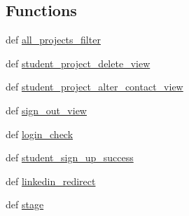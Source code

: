 \subsection*{Functions}
\begin{DoxyCompactItemize}
\item 
def \hyperlink{namespacestudents_1_1views_a021cba8bff39e0d31e6a5357dba3e328}{all\-\_\-projects\-\_\-filter}
\item 
def \hyperlink{namespacestudents_1_1views_a6e2dff61ac7220b69daca0a08765fae8}{student\-\_\-project\-\_\-delete\-\_\-view}
\item 
def \hyperlink{namespacestudents_1_1views_ae09ce1ee44f9b0abd1d61b02f8292b04}{student\-\_\-project\-\_\-alter\-\_\-contact\-\_\-view}
\item 
def \hyperlink{namespacestudents_1_1views_affe8eba083124fd78e3034290bdbf45f}{sign\-\_\-out\-\_\-view}
\item 
def \hyperlink{namespacestudents_1_1views_aa7b40de1ab2e0525b5b35e3c0f9e7a59}{login\-\_\-check}
\item 
def \hyperlink{namespacestudents_1_1views_a8b7d28a21ff72e17a9e1a234cd57bdc4}{student\-\_\-sign\-\_\-up\-\_\-success}
\item 
def \hyperlink{namespacestudents_1_1views_af8444fe95e002a6878c151fb4e34bfd9}{linkedin\-\_\-redirect}
\item 
def \hyperlink{namespacestudents_1_1views_a4b54ff72b1f36578d7f24ce2e8e0bcc0}{stage}
\end{DoxyCompactItemize}


